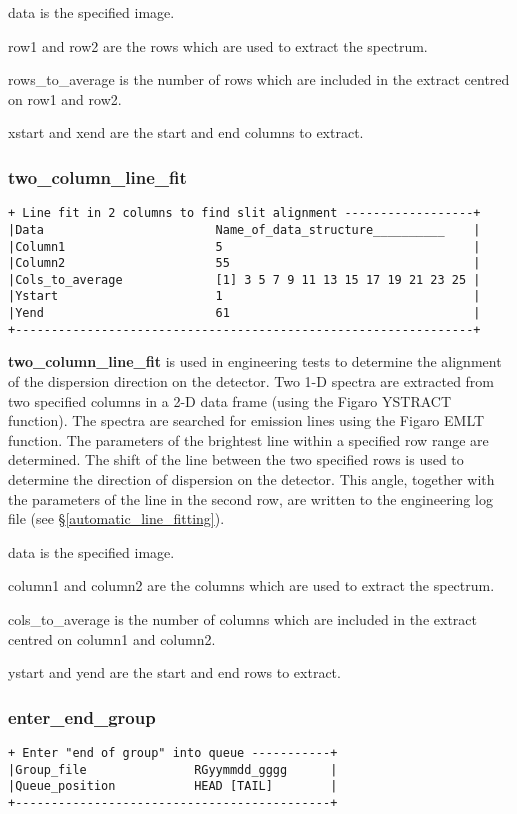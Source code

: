 {{\sf data} is the specified image.

{\sf row1} and {\sf row2} are the rows which are used to extract the spectrum.

{\sf rows\_to\_average} is the number of rows which are included in the
extract centred on {\sf row1} and {\sf row2}.

{\sf xstart} and {\sf xend} are the start and end columns to extract.

\subsubsection{two\_column\_line\_fit}
\begin{verbatim}
+ Line fit in 2 columns to find slit alignment ------------------+
|Data                        Name_of_data_structure__________    |
|Column1                     5                                   |
|Column2                     55                                  |
|Cols_to_average             [1] 3 5 7 9 11 13 15 17 19 21 23 25 |
|Ystart                      1                                   |
|Yend                        61                                  |
+----------------------------------------------------------------+
\end{verbatim}

{\bf two\_column\_line\_fit} is used in engineering tests
to determine the alignment of the dispersion direction on the detector.
Two 1-D {\sf spectra} are extracted from two 
specified columns in a 2-D data frame (using the Figaro YSTRACT function).
The {\sf spectra} are searched for {\sf emission lines} using the Figaro EMLT 
function.
The parameters of the brightest line within a specified row 
range are determined. The shift of the line between the two 
specified rows is used to determine the direction of dispersion on the 
detector.
This angle, together with the parameters of the line in the second 
row, are written to the engineering log file (see \S \ref{automatic_line_fitting}).

{\sf data} is the specified image.

{\sf column1} and {\sf column2} are the columns which are used to extract the 
spectrum.

{\sf cols\_to\_average} is the number of columns which are included in the
extract centred on {\sf column1} and {\sf column2}.

{\sf ystart} and {\sf yend} are the start and end rows to extract.

\subsubsection{enter\_end\_group}
\label{enter_end_group}
\begin{verbatim}
+ Enter "end of group" into queue -----------+
|Group_file               RGyymmdd_gggg      |
|Queue_position           HEAD [TAIL]        |
+--------------------------------------------+
\end{verbatim}

}

